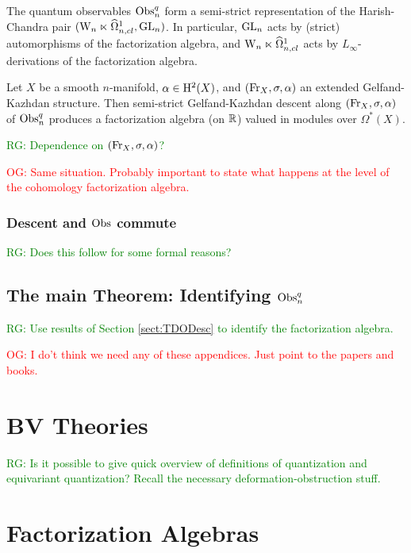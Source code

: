 \documentclass[10pt]{amsart}
\def\owen{\textcolor{red}{OG: }\textcolor{red}}
\def\ryan{\textcolor{green}{RG: }\textcolor{green}}
\begin{document}
\begin{prop} The quantum observables ${\rm Obs}^{q}_n$ form a semi-strict
  representation of the Harish-Chandra pair $({{\rm W}_n} \ltimes \widehat{\Omega}^1_{n,cl}, {\rm GL}_n)$. In
  particular, ${\rm GL}_n$ acts by (strict) automorphisms of the
  factorization algebra, and ${{\rm W}_n} \ltimes \widehat{\Omega}^1_{n,cl}$ acts by
  $L_\infty$-derivations of the factorization algebra. 
\end{prop}

\begin{cor}
Let $X$ be a smooth $n$-manifold, $\alpha \in {\rm
    H}^2(X)$, and $({\rm Fr}_X , \sigma, \alpha)$ an extended Gelfand-Kazhdan structure. Then semi-strict Gelfand-Kazhdan descent along $({\rm Fr}_X, \sigma, \alpha)$ of ${\rm Obs}^q_n$ produces a factorization algebra (on $\mathbb R$) valued in modules over $\Omega^\ast (X)$.  
\end{cor}

\ryan{Dependence on $({\rm Fr}_X, \sigma, \alpha)$?}

\owen{Same situation. Probably important to state what happens at the level of the cohomology factorization algebra.}

\subsubsection{Descent and ${\rm Obs}$ commute}

\ryan{Does this follow for some formal reasons?}


\subsection{The main Theorem: Identifying ${\rm Obs}^q_n$}

\ryan{Use results of Section \ref{sect:TDODesc} to identify the factorization algebra.}

\appendix

\owen{I do't think we need any of these appendices. Just point to the papers and books.}

\section{BV Theories}

\ryan{Is it possible to give quick overview of definitions of quantization and equivariant quantization? Recall the necessary deformation-obstruction stuff.}

\section{Factorization Algebras}
\end{document}
